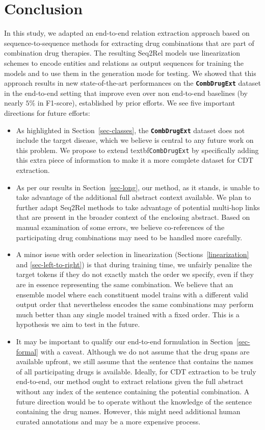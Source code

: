 \documentclass[conference]{IEEEtran}
\begin{document}
\section{Conclusion}
In this study, we adapted an end-to-end relation extraction approach  based on sequence-to-sequence methods for extracting drug combinations that are part of combination drug therapies. The resulting Seq2Rel models use linearization schemes to encode entities and relations as output sequences for training the models and to use them in the generation mode for testing. We showed that this approach results in new state-of-the-art performances on the \textbf{\texttt{CombDrugExt}} dataset in the end-to-end setting that improve even over non end-to-end baselines (by nearly $5\%$ in F1-score), established by prior efforts. We see five important directions for future efforts:
\begin{itemize}
\item As highlighted in Section~\ref{sec-classes}, the \textbf{\texttt{CombDrugExt}} dataset does not include the target disease, which we believe is central to any future work on this problem. We propose to extend textbf{\texttt{CombDrugExt}}  by specifically adding this extra piece of information to make it a more complete dataset for CDT extraction. 

\item As per our results in Section~\ref{sec-long}, our method, as it stands, is unable to take advantage of the additional full abstract context available. We plan  to further adapt Seq2Rel methods to take advantage of potential multi-hop links that are present in the broader context of the enclosing abstract. Based on manual examination of some errors, we believe co-references of the participating drug combinations may need to be handled more carefully. 

\item A minor issue with order selection in linearization (Sections~\ref{linearization} and \ref{sec-left-to-right}) is that during training time, we unfairly penalize the target tokens if they do not exactly match the order we specify, even if they are in essence representing the same combination. We believe that an ensemble model where each constituent model trains with a   different valid output order that nevertheless encodes the same combinations may perform much better than any single model trained with a fixed order. This is a hypothesis we aim to test in the future. 

\item It may be important to qualify our end-to-end formulation in Section~\ref{sec-formal} with a caveat. Although we do not assume that the drug spans are available upfront, we still assume that the sentence that contains the names of all participating drugs is available. Ideally, for CDT  extraction to be truly end-to-end, our method ought to extract relations given the full abstract without any index of the sentence containing the potential combination. A future direction would be to operate without the knowledge of the sentence containing the drug names. However, this might need additional human curated annotations and may be a more expensive process. 



\end{itemize}
\end{document}
